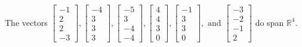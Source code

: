 \begin{exercise}
\begin{exerciseStatement}
  \end{exerciseStatement}
  \begin{exerciseAnswer}
   The vectors \(\left[\begin{array}{r}
-1 \\
2 \\
2 \\
-3
\end{array}\right] , \left[\begin{array}{r}
-4 \\
3 \\
3 \\
3
\end{array}\right] , \left[\begin{array}{r}
-5 \\
3 \\
-4 \\
-4
\end{array}\right] , \left[\begin{array}{r}
4 \\
4 \\
3 \\
0
\end{array}\right] , \left[\begin{array}{r}
-1 \\
3 \\
3 \\
0
\end{array}\right] , \text{ and } \left[\begin{array}{r}
-3 \\
-2 \\
-1 \\
2
\end{array}\right]\) 
  	 do  
	span \(\mathbb{R}^4\).
  


  \end{exerciseAnswer}
\end{exercise}